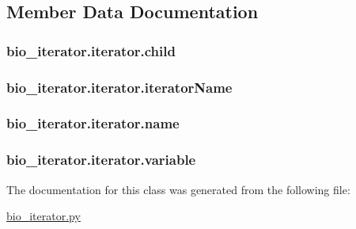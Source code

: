 \subsection{Member Data Documentation}
\hypertarget{classbio__iterator_1_1iterator_a67a5a5a22ba01bcaa168c9e056eb25d0}{
\subsubsection[{child}]{\setlength{\rightskip}{0pt plus 5cm}bio\+\_\+iterator.\+iterator.\+child}}\label{classbio__iterator_1_1iterator_a67a5a5a22ba01bcaa168c9e056eb25d0}
\hypertarget{classbio__iterator_1_1iterator_a10e4188d8459b5342d609df5a1267a5d}{
\subsubsection[{iterator\+Name}]{\setlength{\rightskip}{0pt plus 5cm}bio\+\_\+iterator.\+iterator.\+iterator\+Name}}\label{classbio__iterator_1_1iterator_a10e4188d8459b5342d609df5a1267a5d}
\hypertarget{classbio__iterator_1_1iterator_a0dbadbe5cc949e2bfa25591b22956989}{
\subsubsection[{name}]{\setlength{\rightskip}{0pt plus 5cm}bio\+\_\+iterator.\+iterator.\+name}}\label{classbio__iterator_1_1iterator_a0dbadbe5cc949e2bfa25591b22956989}
\hypertarget{classbio__iterator_1_1iterator_a2fd1e60735f344291efbbbf0fbf8a48a}{
\subsubsection[{variable}]{\setlength{\rightskip}{0pt plus 5cm}bio\+\_\+iterator.\+iterator.\+variable}}\label{classbio__iterator_1_1iterator_a2fd1e60735f344291efbbbf0fbf8a48a}


The documentation for this class was generated from the following file\+:\begin{DoxyCompactItemize}
\item 
\hyperlink{bio__iterator_8py}{bio\+\_\+iterator.\+py}\end{DoxyCompactItemize}
